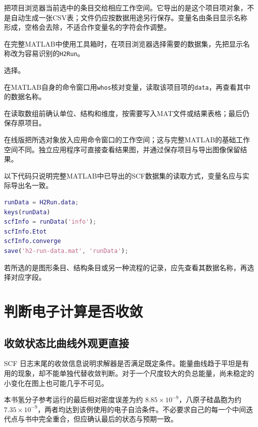 把项目浏览器当前选中的条目交给相应工作空间。它导出的是这个项目项对象，不是自动生成一张CSV表；文件仍应按数据用途另行保存。变量名由条目显示名称形成，空格会去除，不适合作变量名的字符会作调整。

\begin{steps}
\item 在完整MATLAB\regmark{}中使用工具箱时，在项目浏览器选择需要的数据集，先把显示名称改为容易识别的\texttt{H2Run}。
\item 选择。
\item 在MATLAB\regmark{}自身的命令窗口用\texttt{whos}核对变量，读取该项目项的\texttt{data}，再查看其中的数据名称。
\item 在读取数组前确认单位、结构和维度，按需要写入MAT文件或结果表格；最后仍保存原项目。
\end{steps}

在线版把所选对象放入应用命令窗口的工作空间；这与完整MATLAB\regmark{}的基础工作空间不同。独立应用程序可直接查看结果图，并通过保存项目与导出图像保留结果。

以下代码只说明完整MATLAB\regmark{}中已导出的SCF数据集的读取方式，变量名应与实际导出名一致。

\begin{lstlisting}[language=Matlab]
runData = H2Run.data;
keys(runData)
scfInfo = runData('info');
scfInfo.Etot
scfInfo.converge
save('h2-run-data.mat', 'runData');
\end{lstlisting}

若所选的是图形条目、结构条目或另一种流程的记录，应先查看其数据名称，再选择对应字段。


\section{判断电子计算是否收敛}

\subsection{收敛状态比曲线外观更直接}

SCF 日志末尾的收敛信息说明求解器是否满足既定条件。能量曲线趋于平坦是有用的现象，却不能单独代替收敛判断。对于一个尺度较大的负总能量，尚未稳定的小变化在图上也可能几乎不可见。

本书氢分子参考运行的最后相对密度误差为约 $8.85\times10^{-9}$，八原子硅晶胞为约 $7.35\times10^{-9}$，两者均达到该例使用的电子自洽条件。不必要求自己的每一个中间迭代点与书中完全重合，但应确认最后的状态与预期一致。


